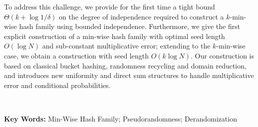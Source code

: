 To address this challenge, we provide for the first time a tight bound $\Theta(k + \log 1/\delta)$ on the degree of independence required to construct a $k$-min-wise hash family using bounded independence. Furthermore, we give the first explicit construction of a min-wise hash family with optimal seed length $O(\log N)$ and sub-constant multiplicative error; extending to the $k$-min-wise case, we obtain a construction with seed length $O(k \log N)$. Our construction is based on classical bucket hashing, randomness recycling and domain reduction, and introduces new uniformity and direct sum structures to handle multiplicative error and conditional probabilities.

\

\noindent \textbf{Key Words:}
Min-Wise Hash Family; Pseudorandomness; Derandomization